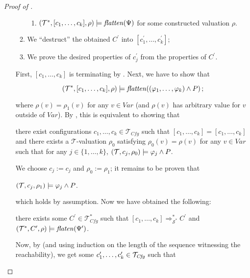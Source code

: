 \begin{proof}[Proof of ]
\begin{enumerate}
\begin{enumerate}
\begin{enumerate}
            \item $(\mathcal{T}^*, [c_1,\ldots,c_k], \rho) \models \mathit{flatten}(\Psi)$ for some constructed valuation $\rho$.
        \end{enumerate}
        \item We ``destruct'' the obtained $C^\prime$ into $[c^\prime_1,\ldots,c^\prime_k]$;
        \item We prove the desired properties of $c^\prime_j$ from the properties of $C^\prime$.
    \end{enumerate}
    First, $[c_1,\ldots,c_k]$ is terminating by .
    Next, we have to show that
    \begin{proofenv}
        \begin{equation*}
            (\mathcal{T}^*, [c_1,\ldots,c_k], \rho) \models \mathit{flatten}((\varphi_1,\ldots,\varphi_k) \land P) \, ;
        \end{equation*}
    \end{proofenv}
    where $\rho(v) = \rho_1(v)$ for any $v \in \mathit{Var}$ (and $\rho(v)$ has arbitrary value for $v$ outside of $\mathit{Var}$).
    By , this is equivalent to showing that
    \begin{proofenv}
        there exist configurations $c_1, \ldots, c_k \in \mathcal{T}_{\mathit{Cfg}}$ such that
        $[c_1, \ldots, c_k] = [c_1, \ldots, c_k]$ and there exists a $\mathcal{T}$-valuation $\rho_0$
        satisfying $\rho_0(v) = \rho(v)$ for any $v \in \mathit{Var}$
        such that for any $j \in \{ 1, \ldots, k \}$, $(\mathcal{T}, c_j, \rho_0) \models \varphi_j \land P$.
    \end{proofenv}
    We choose $c_j := c_j$ and $\rho_0 := \rho_1$; it remains to be proven that
    \begin{proofenv}
        $(\mathcal{T}, c_j, \rho_1) \models \varphi_j \land P$.    
    \end{proofenv}
    which holds by assumption.
    Now we have obtained the following:
    \begin{proofenv}
        there exists some $C^\prime \in \mathcal{T}_{\mathit{Cfg}}^*$ such that
        $[c_1,\ldots,c_k] \Rightarrow_{\mathcal{S}^*}^* C^\prime$
        and $(\mathcal{T}^*, C^\prime, \rho) \models \mathit{flaten}(\Psi^\prime)$.
    \end{proofenv}
    Now, by  (and using induction on the length of the
    sequence witnessing the reachability),
    we get some $c^\prime_1,\ldots,c^\prime_k \in \mathcal{T}_{\mathit{Cfg}}$ such that

\end{enumerate}
\end{proof}
